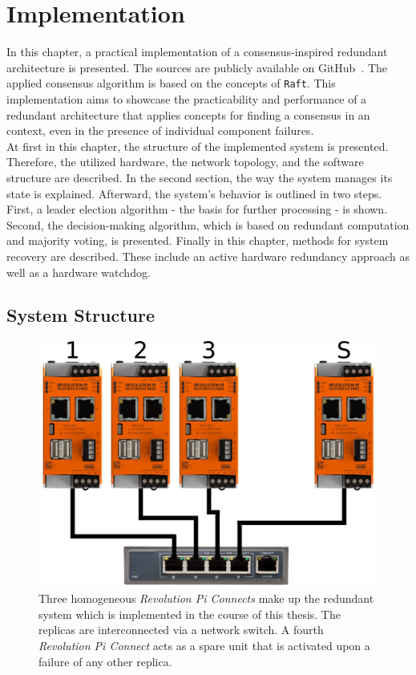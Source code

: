 \chapter{Implementation}
\label{cpt:Implementation}

In this chapter, a practical implementation of a consensus-inspired redundant architecture is presented.
The sources are publicly available on GitHub~\cite{GitHubSources}.
The applied consensus algorithm is based on the concepts of \texttt{Raft}.
This implementation aims to showcase the practicability and performance of a redundant architecture that applies  concepts for finding a consensus in an  context, even in the presence of individual component failures.
\\

\noindent
At first in this chapter, the structure of the implemented system is presented.
Therefore, the utilized hardware, the network topology, and the software structure are described.
In the second section, the way the system manages its state is explained.
Afterward, the system's behavior is outlined in two steps.
First, a leader election algorithm - the basis for further processing - is shown.
Second, the decision-making algorithm, which is based on redundant computation and majority voting, is presented.
Finally in this chapter, methods for system recovery are described.
These include an active hardware redundancy approach as well as a hardware watchdog.

\section{System Structure}

\begin{figure}[!h]
	\centering
	\includegraphics[width=0.8\linewidth]{images/setup}
	\caption{Three homogeneous \textit{Revolution Pi Connects} make up the redundant system which is implemented in the course of this thesis. The replicas are interconnected via a network switch. A fourth \textit{Revolution Pi Connect} acts as a spare unit that is activated upon a failure of any other replica.}
	\label{fig:SystemSetup}
\end{figure}

